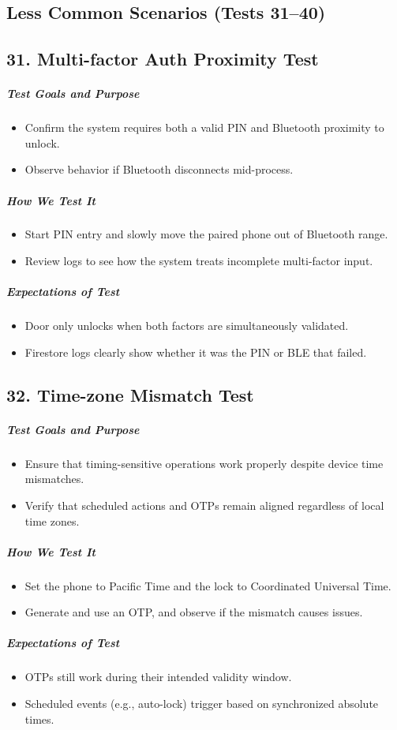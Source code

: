 
\newpage
\subsection{Less Common Scenarios (Tests 31–40)}

\subsection*{31. Multi-factor Auth Proximity Test}
\subparagraph{Test Goals and Purpose}
\begin{itemize}
    \item Confirm the system requires both a valid PIN and Bluetooth proximity to unlock.
    \item Observe behavior if Bluetooth disconnects mid-process.
\end{itemize}
\subparagraph{How We Test It}
\begin{itemize}
    \item Start PIN entry and slowly move the paired phone out of Bluetooth range.
    \item Review logs to see how the system treats incomplete multi-factor input.
\end{itemize}
\subparagraph{Expectations of Test}
\begin{itemize}
    \item Door only unlocks when both factors are simultaneously validated.
    \item Firestore logs clearly show whether it was the PIN or BLE that failed.
\end{itemize}

\subsection*{32. Time-zone Mismatch Test}
\subparagraph{Test Goals and Purpose}
\begin{itemize}
    \item Ensure that timing-sensitive operations work properly despite device time mismatches.
    \item Verify that scheduled actions and OTPs remain aligned regardless of local time zones.
\end{itemize}
\subparagraph{How We Test It}
\begin{itemize}
    \item Set the phone to Pacific Time and the lock to Coordinated Universal Time.
    \item Generate and use an OTP, and observe if the mismatch causes issues.
\end{itemize}
\subparagraph{Expectations of Test}
\begin{itemize}
    \item OTPs still work during their intended validity window.
    \item Scheduled events (e.g., auto-lock) trigger based on synchronized absolute times.
\end{itemize}

